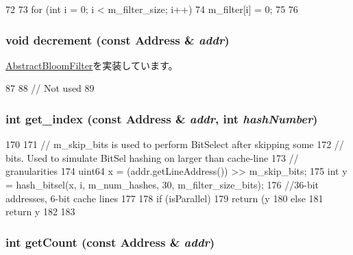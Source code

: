 \begin{DoxyCode}
72 {
73     for (int i = 0; i < m_filter_size; i++) {
74         m_filter[i] = 0;
75     }
76 }
\end{DoxyCode}
\hypertarget{classMultiBitSelBloomFilter_addb6b805abb8328082a24926f2bf8c84}{
\subsubsection[{decrement}]{\setlength{\rightskip}{0pt plus 5cm}void decrement (const {\bf Address} \& {\em addr})}}
\label{classMultiBitSelBloomFilter_addb6b805abb8328082a24926f2bf8c84}


\hyperlink{classAbstractBloomFilter_aa387151f4ab03c6cd497d4385e34c21a}{AbstractBloomFilter}を実装しています。


\begin{DoxyCode}
87 {
88     // Not used
89 }
\end{DoxyCode}
\hypertarget{classMultiBitSelBloomFilter_a4e668c45847b52c4595b4c5c5f7fd8d0}{
\subsubsection[{get\_\-index}]{\setlength{\rightskip}{0pt plus 5cm}int get\_\-index (const {\bf Address} \& {\em addr}, \/  int {\em hashNumber})}}
\label{classMultiBitSelBloomFilter_a4e668c45847b52c4595b4c5c5f7fd8d0}



\begin{DoxyCode}
170 {
171     // m_skip_bits is used to perform BitSelect after skipping some
172     // bits. Used to simulate BitSel hashing on larger than cache-line
173     // granularities
174     uint64 x = (addr.getLineAddress()) >> m_skip_bits;
175     int y = hash_bitsel(x, i, m_num_hashes, 30, m_filter_size_bits);
176     //36-bit addresses, 6-bit cache lines
177 
178     if (isParallel) {
179         return (y %
180     } else {
181         return y %
182     }
183 }
\end{DoxyCode}
\hypertarget{classMultiBitSelBloomFilter_abb722634d5846105b673e9496df8d062}{
\subsubsection[{getCount}]{\setlength{\rightskip}{0pt plus 5cm}int getCount (const {\bf Address} \& {\em addr})}}
\label{classMultiBitSelBloomFilter_abb722634d5846105b673e9496df8d062}


